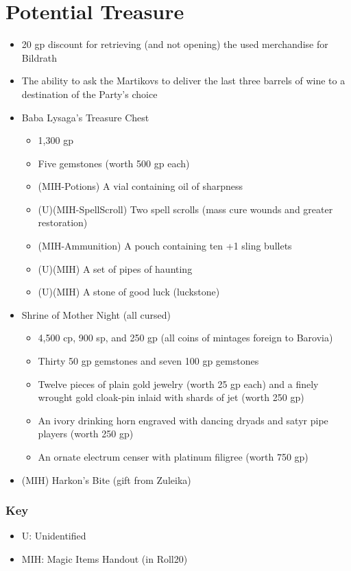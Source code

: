 \documentclass[a4paper,11pt]{article}
\begin{document}
\section{Potential Treasure}
\label{sec:PotentialTreasure}
\begin{itemize}
  \item 20 gp discount for retrieving (and not opening) the used merchandise for Bildrath
  \item The ability to ask the Martikovs to deliver the last three barrels of wine to a destination of the 
  Party's choice
  \item Baba Lysaga's Treasure Chest
  \begin{itemize}
    \item 1,300 gp
    \item Five gemstones (worth 500 gp each)
    \item (MIH-Potions) A vial containing oil of sharpness
    \item (U)(MIH-SpellScroll) Two spell scrolls (mass cure wounds and greater restoration)
    \item (MIH-Ammunition) A pouch containing ten +1 sling bullets
    \item (U)(MIH) A set of pipes of haunting
    \item (U)(MIH) A stone of good luck (luckstone)
  \end{itemize}
  \item Shrine of Mother Night (all cursed)
  \begin{itemize}
    \item 4,500 cp, 900 sp, and 250 gp (all coins of mintages foreign to Barovia)
    \item Thirty 50 gp gemstones and seven 100 gp gemstones
    \item Twelve pieces of plain gold jewelry (worth 25 gp each) and a finely wrought gold cloak-pin inlaid with 
      shards of jet (worth 250 gp)
    \item An ivory drinking horn engraved with dancing dryads and satyr pipe players (worth 250 gp)
    \item An ornate electrum censer with platinum filigree (worth 750 gp)
  \end{itemize}
  \item (MIH) Harkon's Bite (gift from Zuleika)
\end{itemize}
\subsubsection*{Key}
\begin{itemize}
    \item U: Unidentified
    \item MIH: Magic Items Handout (in Roll20)
\end{itemize}
\end{document}
